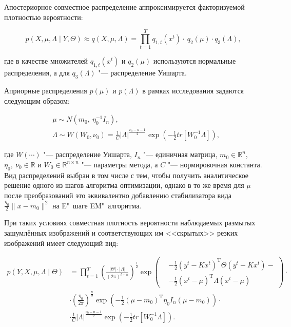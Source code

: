Апостериорное совместное распределение аппроксимируется факторизуемой плотностью вероятности:

\begin{equation*}
	p\left(X,\mu,\Lambda\middle|Y,\Theta\right)\approx q\left(X,\mu,\Lambda\right)=\prod_{t=1}^{T}{q_{1,t}\left(x^t\right)\cdot\ q_2\left(\mu\right)\cdot q_3\left(\Lambda\right)},
\end{equation*}

\noindent где в качестве множителей $q_{1,t}\left(x^t\right)$ и $q_2\left(\mu\right)$ используются нормальные распределения, а для $q_3\left(\Lambda\right)$ "--- распределение Уишарта.

Априорные распределения $p\left(\mu\right)$ и $p\left(\Lambda\right)$ в рамках исследования задаются следующим образом:

\begin{align*}
	&\mu \sim N\left(m_0,\ \eta_0^{-1}I_n\right), \\
	&\Lambda \sim W\left(W_0,\nu_0\right)=\frac{1}{C}\left|\Lambda\right|^\frac{\nu_0-n-1}{2}\exp{\left(-\frac{1}{2}tr\left[W_0^{-1}\Lambda\right]\right)},
\end{align*}

\noindent где $W(\cdots)$ "--- распределение Уишарта, $I_n$ "--- единичная матрица, $m_0\in\mathbb{R}^n$, $\eta_0,\ \nu_0\in\mathbb{R}$ и $W_0\in\mathbb{R}^{n \times n}$ "--- параметры метода, а $C$ "--- нормировочная константа. Вид распределений выбран в том числе с тем, чтобы получить аналитическое решение одного из шагов алгоритма оптимизации, однако в то же время для $\mu$ после преобразований это эквивалентно добавлению стабилизатора вида $\frac{\eta_0}{2} \lVert x - m_0 \rVert^2$ на E"~шаге EM"~алгоритма.

При таких условиях совместная плотность вероятности наблюдаемых размытых зашумлённых изображений и соответствующих им <<скрытых>> резких изображений имеет следующий вид:

\begin{align*}
	p\left(Y,X,\mu,\Lambda \middle| \Theta\right) &= \prod_{t=1}^{T} \left( \frac{\lvert\Theta\rvert \cdot \lvert\Lambda\rvert}{{\left(2\pi\right)}^{l+n}} \right)^\frac{1}{2} \exp\left(
	\begin{aligned}
		&-\frac{1}{2}\left(y^t-Kx^t\right)^\mathrm{T} \Theta \left(y^t-Kx^t\right) - \\
		&-\frac{1}{2}\left(x^t-\mu\right)^\mathrm{T} \Lambda \left(x^t-\mu\right)
	\end{aligned}
	\right) \cdot \\
	&\cdot \left(\frac{\eta_0}{2\pi}\right)^\frac{n}{2} \exp \left(-\frac{1}{2}\left(\mu-m_0\right)^\mathrm{T} \eta_0 I_n \left(\mu-m_0\right)\right) \cdot \\
	&\cdot \frac{1}{C}\lvert\Lambda\rvert^\frac{\nu_0-n-1}{2}\exp{\left(-\frac{1}{2}tr\left[W_0^{-1}\Lambda\right]\right)}.
\end{align*}


